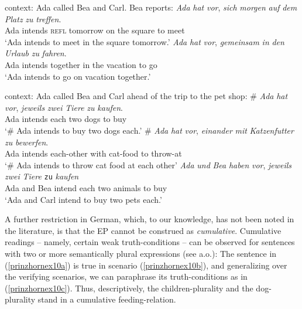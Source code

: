 \documentclass[output=paper,colorlinks,citecolor=brown,
]{langscibook}
\begin{document}
\ea \label{prinzhornex8} {\sc context: } Ada called Bea and Carl. Bea reports:
\ea \gll \textit{Ada} \textit{hat} \textit{vor}, \textit{sich} \textit{morgen} \textit{auf} \textit{dem} \textit{Platz} \textit{zu} \textit{treffen}.\\
   Ada intends {} \textsc{refl} tomorrow on the square to meet\\
\glt `Ada intends to meet in the square tomorrow.'\label{prinzhorncoll-pred}
\ex   \gll \textit{Ada} \textit{hat} \textit{vor}, \textit{gemeinsam} \textit{in} \textit{den} \textit{Urlaub} \textit{zu} \textit{fahren}.\\
   Ada intends {} together in the vacation to go\\
\glt `Ada intends to go on vacation together.'\label{prinzhornvaca}
\z \z



\ea \label{prinzhornex9} {\sc context: } Ada called Bea and Carl ahead of the trip to the pet shop:
\ea \gll $\#$ \textit{Ada} \textit{hat}  \textit{vor}, \textit{jeweils} \textit{zwei} \textit{Tiere} \textit{zu} \textit{kaufen}.\\
   {} Ada intends {} each two dogs to buy \\
\glt `$\#$ Ada intends to buy two dogs each.' \label{prinzhornex9a}
\ex   \gll $\#$ \textit{Ada} \textit{hat} \textit{vor}, \textit{einander} \textit{mit} \textit{Katzenfutter} \textit{zu} \textit{bewerfen}.\\
  {}  Ada intends {} each-other with cat-food to throw-at\\
\glt `$\#$ Ada intends to throw cat food at each other'  \label{prinzhornex9b}
\ex \gll \textit{Ada} \textit{und} \textit{Bea} \textit{haben} \textit{vor}, \textit{jeweils} \textit{zwei} \textit{Tiere} \texttt{zu} \textit{kaufen}\\
Ada and Bea intend {} each two animals to buy\\
\glt `Ada and Carl intend to buy two pets each.'\label{prinzhornex9c}
\z \z

A further restriction in German, which, to our knowledge, has not been noted in the literature, is that the EP cannot be construed as {\it cumulative}. Cumulative readings -- namely, certain weak truth-conditions -- can be observed for sentences with two or more semantically plural expressions (see \citealt{Langendoen:1978} a.o.): The sentence in (\ref{prinzhornex10a}) is true in  scenario (\ref{prinzhornex10b}), and generalizing over the verifying scenarios, we can paraphrase its truth-conditions as in (\ref{prinzhornex10c}). Thus, descriptively, the children-plurality and the dog-plurality stand in a cumulative feeding-relation.
\end{document}
